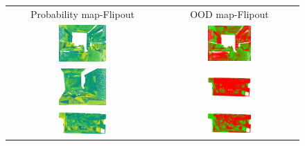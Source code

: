    \begin{figure}[h!]
        \centering
        \begin{tabular}{cc}
            Probability map-Flipout & OOD map-Flipout \\
            \includegraphics[width=0.33\textwidth, height=0.18\textheight]{images/ood_imgs/fout_s3dis/ofc_3_fout_prob.pdf}& 
            \includegraphics[width=0.33\textwidth, height=0.18\textheight]{images/ood_imgs/fout_s3dis/fout_prob_2.pdf}\\

            \includegraphics[width=0.33\textwidth, height=0.18\textheight]{images/ood_imgs/fout_s3dis/cf1_fout_prob.pdf}& 
            \includegraphics[width=0.33\textwidth, height=0.18\textheight]{images/ood_imgs/fout_s3dis/fout_prob_4.pdf}\\

            \includegraphics[width=0.33\textwidth, height=0.18\textheight]{images/ood_imgs/fout_s3dis/pnt_1_fout_prob.pdf}& 
            \includegraphics[width=0.33\textwidth, height=0.18\textheight]{images/ood_imgs/fout_s3dis/fout_prob_3.pdf}\\


\end{tabular}
\end{figure}
